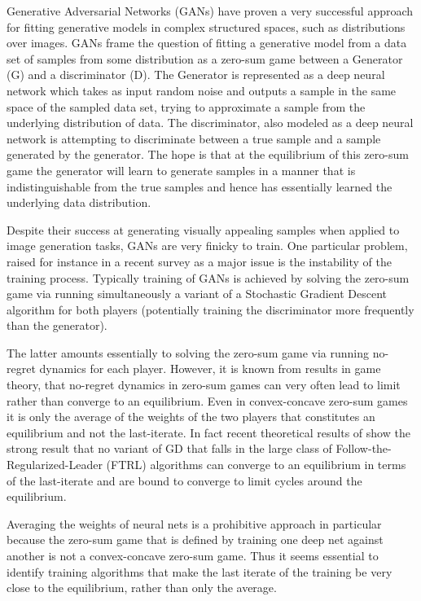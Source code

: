 Generative Adversarial Networks (GANs) \citep{Goodfellow14} have proven a very successful approach for fitting generative models in complex structured spaces, such as distributions over images. GANs frame the question of fitting a generative model from a data set of samples from some distribution as a zero-sum game between a Generator (G) and a discriminator (D). The Generator is represented as a deep neural network which takes as input random noise and outputs a sample in the same space of the sampled data set, trying to approximate a sample from the underlying distribution of data. The discriminator, also modeled as a deep neural network is attempting to discriminate between a true sample and a sample generated by the generator. The hope is that at the equilibrium of this zero-sum game the generator will learn to generate samples in a manner that is indistinguishable from the true samples and hence has essentially learned the underlying data distribution.


Despite their success at generating visually appealing samples when applied to image generation tasks, GANs are very finicky to train. One particular problem, raised for instance in a recent survey as a major issue \citep{Goodfellow17} is the instability of the training process. Typically training of GANs is achieved by solving the zero-sum game via running simultaneously a variant of a Stochastic Gradient Descent algorithm for both players (potentially training the discriminator more frequently than the generator).

The latter amounts essentially to solving the zero-sum game via running no-regret dynamics for each player. However, it is known from results in game theory, that no-regret dynamics in zero-sum games can very often lead to limit  %
rather than converge to an equilibrium. Even in convex-concave zero-sum games it is only the average of the weights of the two players that constitutes an equilibrium and not the last-iterate. In fact recent theoretical results of \cite{Piliouras} show the strong result that no variant of GD that falls in the large class of Follow-the-Regularized-Leader (FTRL) algorithms can converge to an equilibrium in terms of the last-iterate and are bound to converge to limit cycles around the equilibrium. 

Averaging the weights of neural nets is a prohibitive approach in particular because the zero-sum game that is defined by training one deep net against another is not a convex-concave zero-sum game. Thus it seems essential to identify training algorithms that make the last iterate of the training be very close to the equilibrium, rather than only the average.

